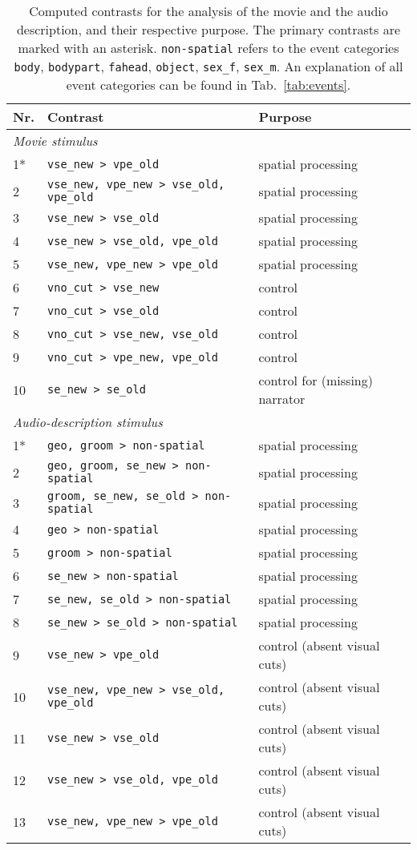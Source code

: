 \documentclass[english]{article}
\begin{document}
\begin{table*}[tbp]
  \caption{Computed contrasts for the analysis of the movie and the audio
    description, and their respective purpose.
    The primary contrasts are marked with an asterisk.
    \texttt{non-spatial} refers to the event categories
    \texttt{body}, \texttt{bodypart}, \texttt{fahead},
    \texttt{object}, \texttt{sex\_f}, \texttt{sex\_m}.
    An explanation of all event categories can be found in
    Tab.~\ref{tab:events}.
    }
\label{tab:contrasts}
\begin{tabular}{lll}
\toprule
\textbf{Nr.} &  \textbf{Contrast} & \textbf{Purpose} \\
\midrule
\multicolumn{3}{l}{\textit{Movie stimulus}}\\
1* & \texttt{vse\_new > vpe\_old} & spatial processing \tabularnewline
2 & \texttt{vse\_new, vpe\_new > vse\_old, vpe\_old} & spatial processing \tabularnewline
3 & \texttt{vse\_new > vse\_old} & spatial processing \tabularnewline
4 & \texttt{vse\_new > vse\_old, vpe\_old} & spatial processing \tabularnewline
5 & \texttt{vse\_new, vpe\_new > vpe\_old} & spatial processing \tabularnewline
6 & \texttt{vno\_cut > vse\_new} & control \tabularnewline
7 & \texttt{vno\_cut > vse\_old} & control \tabularnewline
8 & \texttt{vno\_cut > vse\_new, vse\_old} & control \tabularnewline
9 & \texttt{vno\_cut > vpe\_new, vpe\_old} & control \tabularnewline
10 & \texttt{se\_new > se\_old} & control for (missing) narrator \tabularnewline
\midrule
\multicolumn{3}{l}{\textit{Audio-description stimulus}}\\
1* & \texttt{geo, groom > non-spatial} & spatial processing \tabularnewline
2 & \texttt{geo, groom, se\_new > non-spatial} & spatial processing \tabularnewline
3 & \texttt{groom, se\_new, se\_old > non-spatial}  & spatial processing \tabularnewline
4 & \texttt{geo > non-spatial} & spatial processing \tabularnewline
5 & \texttt{groom > non-spatial} & spatial processing \tabularnewline
6 & \texttt{se\_new > non-spatial} & spatial processing \tabularnewline
7 & \texttt{se\_new, se\_old > non-spatial} & spatial processing \tabularnewline
8 & \texttt{se\_new > se\_old > non-spatial} & spatial processing \tabularnewline
9 & \texttt{vse\_new > vpe\_old} & control (absent visual cuts) \tabularnewline
10 & \texttt{vse\_new, vpe\_new > vse\_old, vpe\_old} & control (absent visual cuts) \tabularnewline
11 & \texttt{vse\_new > vse\_old} & control (absent visual cuts) \tabularnewline
12 & \texttt{vse\_new > vse\_old, vpe\_old} & control (absent visual cuts) \tabularnewline
13 & \texttt{vse\_new, vpe\_new > vpe\_old} & control (absent visual cuts) \tabularnewline
\bottomrule
\end{tabular}
\end{table*}
\end{document}
